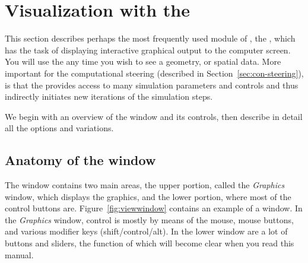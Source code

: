 %
%
  \newcommand{\viewerwindow}%
  {\centerline{\epsfig{file=figures/viewwindow.eps,height=4in}}}
\begin{htmlonly}
  \newcommand{\viewerwindow}{%
  \htmladdimg[align=top,width="100%
  {../figures/viewwindow.jpg}}
\end{htmlonly}

  \newcommand{\extendedwindow}%
  {\centerline{\epsfig{file=figures/viewwindow-ext.eps,height=4in}}}
\begin{htmlonly}
  \newcommand{\extendedwindow}{%
  \htmladdimg[align=top,width="100%
  {../figures/viewwindow-ext.jpg}}
\end{htmlonly}
\newcommand{\graphics}{\emph{Graphics}}

\section{Visualization with the \viewer{}}
\label{sec:viewer}
\index{\viewer{}}

This section describes perhaps the most frequently used module of \SR{},
the \viewer{}, which has the task of displaying interactive graphical output
to the computer screen.  You will use the \viewer{} any time you wish to see
a geometry, or spatial data.  More important for the computational
steering (described in Section~\ref{sec:con-steering}), is that the \viewer{}
provides access to many simulation parameters and controls and thus
indirectly initiates new iterations of the simulation steps.

We begin with an overview of the \viewer{} window and its controls, then
describe in detail all the options and variations.

\subsection{Anatomy of the \viewer{} window}
\label{sec:viewer-anatomy} 

The \viewer{} window contains two main areas, the upper portion, called the
\graphics{} window, which displays the graphics, and the lower portion,
where most of the control buttons are.  Figure~\ref{fig:viewwindow}
contains an example of a \viewer{} window. In the \graphics{}
window, control is mostly by means of the mouse, mouse buttons, and various
modifier keys (shift/control/alt).  In the lower window are a lot of
buttons and sliders, the function of which will become clear when you read
this manual.

